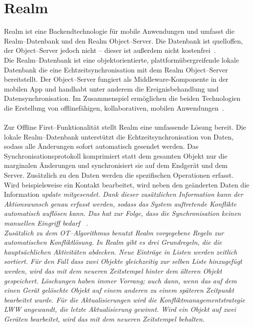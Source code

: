 \section{\label{sub:realm}Realm}
Realm ist eine Backendtechnologie für mobile Anwendungen und umfasst die Realm--Datenbank und den Realm Object--Server.
Die Datenbank ist quelloffen, der Object--Server jedoch nicht -- dieser ist außerdem nicht kostenfrei~\cite{realm}.\\
Die Realm--Datenbank ist eine objektorientierte, plattformübergreifende lokale Datenbank die eine Echtzeitsynchronisation mit dem Realm Object--Server bereitstellt.
Der Object--Server fungiert als \gls{Middleware}-Komponente in der mobilen \gls{App} und handhabt unter anderem die Ereignisbehandlung und Datensynchronisation.
Im Zusammenspiel ermöglichen die beiden Technologien die Erstellung von offlinefähigen, kollaborativen, mobilen Anwendungen~\cite{realm_whitepaper}.\\\\
%
%
Zur Offline First--Funktionalität stellt Realm eine umfassende Lösung bereit.
Die lokale Realm--Datenbank unterstützt die Echtzeitsynchronisation von Daten, sodass alle Änderungen sofort automatisch gesendet werden.
Das Synchronisationsprotokoll komprimiert statt dem gesamten Objekt nur die marginalen Änderungen und synchronisiert sie auf dem Endgerät und dem Server.
Zusätzlich zu den Daten werden die spezifischen Operationen erfasst. 
Wird beispielsweise ein Kontakt bearbeitet, wird neben den geänderten Daten die Information \it{update} mitgesendet.
Dank dieser zusätzlichen Information kann der Aktionswunsch genau erfasst werden, sodass das System auftretende Konflikte automatisch auflösen kann.
Das hat zur Folge, dass die Synchronisation keinen manuellen Eingriff bedarf ~\cite{realm_offline_whitepaper}.\\
%
Zusätzlich zu dem \gls{OT}--Algorithmus benutzt Realm vorgegebene Regeln zur automatischen Konfliktlösung.
In Realm gibt es drei Grundregeln, die die hauptsächlichen Aktivitäten abdecken.
Neue Einträge in Listen werden zeitlich sortiert. Für den Fall dass zwei Objekte gleichzeitig zur selben Liste hinzugefügt werden, wird das mit dem neueren Zeitstempel hinter dem älteren Objekt gespeichert.
Löschungen haben immer Vorrang; auch dann, wenn das auf dem einen Gerät gelöschte Objekt auf einem anderen zu einem späteren Zeitpunkt bearbeitet wurde.
Für die Aktualisierungen wird die Konfliktmanagementstrategie \gls{LWW} angewandt, die letzte Aktualisierung gewinnt.
Wird ein Objekt auf zwei Geräten bearbeitet, wird das mit dem neueren Zeitstempel behalten.\\ 
